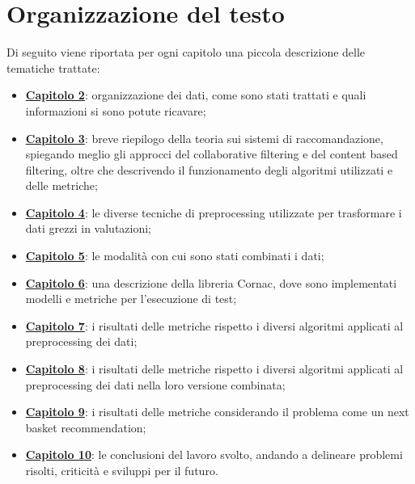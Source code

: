 \section{Organizzazione del testo}
Di seguito viene riportata per ogni capitolo una piccola descrizione delle tematiche trattate:
\begin{itemize}
	\item \hyperlink{(chap:capitolo3)}{\textbf{Capitolo 2}}: organizzazione dei dati, come sono stati trattati e quali informazioni si sono potute ricavare;
	\item \hyperlink{(chap:capitolo4)}{\textbf{Capitolo 3}}: breve riepilogo della teoria sui sistemi di raccomandazione, spiegando meglio gli approcci del collaborative filtering e del content based filtering, oltre che descrivendo il funzionamento degli algoritmi utilizzati e delle metriche;
	\item \hyperlink{(chap:capitolo5)}{\textbf{Capitolo 4}}: le diverse tecniche di preprocessing utilizzate per trasformare i dati grezzi in valutazioni;
	\item \hyperlink{(chap:capitolo5)}{\textbf{Capitolo 5}}: le modalità con cui sono stati combinati i dati;
	\item \hyperlink{(chap:capitolo6)}{\textbf{Capitolo 6}}: una descrizione della libreria Cornac, dove sono implementati modelli e metriche per l'esecuzione di test;
	\item \hyperlink{(chap:capitolo7)}{\textbf{Capitolo 7}}: i risultati delle metriche rispetto i diversi algoritmi applicati al preprocessing dei dati;
	\item \hyperlink{(chap:capitolo8)}{\textbf{Capitolo 8}}: i risultati delle metriche rispetto i diversi algoritmi applicati al preprocessing dei dati nella loro versione combinata;
	\item \hyperlink{(chap:capitolo9)}{\textbf{Capitolo 9}}: i risultati delle metriche considerando il problema come un next basket recommendation;
	\item \hyperlink{(chap:capitolo10)}{\textbf{Capitolo 10}}: le conclusioni del lavoro svolto, andando a delineare problemi risolti, criticità e sviluppi per il futuro.
\end{itemize}
